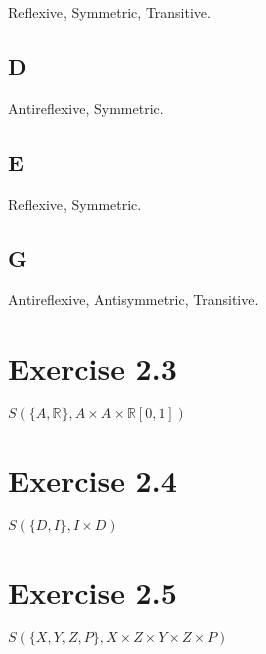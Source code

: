 \documentclass[12pt]{article}
\begin{document}
Reflexive, Symmetric, Transitive.

\subsection{D}

Antireflexive, Symmetric.

\subsection{E}

Reflexive, Symmetric.

\subsection{G}

Antireflexive, Antisymmetric, Transitive.

\section{Exercise 2.3}

$ S(\{A, \mathbb{R}\}, A \times A \times \mathbb{R}[0,1]) $

\section{Exercise 2.4}

$ S(\{D, I\}, I \times D) $

\section{Exercise 2.5}

$ S(\{X, Y, Z, P\}, X \times Z \times Y \times Z \times P) $
\end{document}
